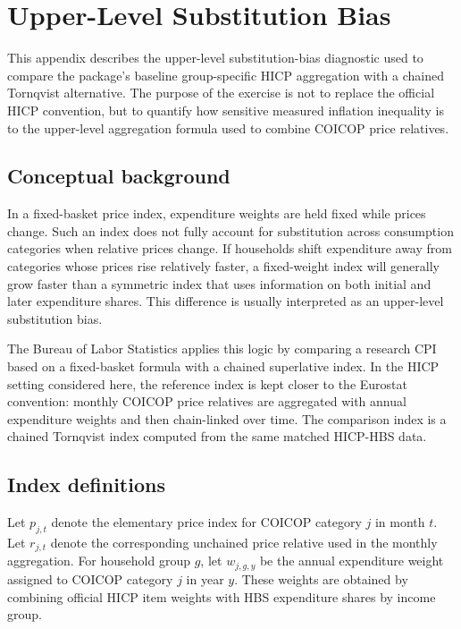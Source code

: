 \appendix
\section{Upper-Level Substitution Bias}
\label{app:substitution-bias}

This appendix describes the upper-level substitution-bias diagnostic used to
compare the package's baseline group-specific HICP aggregation with a chained
Tornqvist alternative. The purpose of the exercise is not to replace the
official HICP convention, but to quantify how sensitive measured inflation
inequality is to the upper-level aggregation formula used to combine COICOP
price relatives.

\subsection{Conceptual background}

In a fixed-basket price index, expenditure weights are held fixed while prices
change. Such an index does not fully account for substitution across
consumption categories when relative prices change. If households shift
expenditure away from categories whose prices rise relatively faster, a
fixed-weight index will generally grow faster than a symmetric index that uses
information on both initial and later expenditure shares. This difference is
usually interpreted as an upper-level substitution bias.

The Bureau of Labor Statistics applies this logic by comparing a research CPI
based on a fixed-basket formula with a chained superlative index. In the HICP
setting considered here, the reference index is kept closer to the Eurostat
convention: monthly COICOP price relatives are aggregated with annual
expenditure weights and then chain-linked over time. The comparison index is a
chained Tornqvist index computed from the same matched HICP-HBS data.

\subsection{Index definitions}

Let \(p_{j,t}\) denote the elementary price index for COICOP category \(j\) in
month \(t\). Let \(r_{j,t}\) denote the corresponding unchained price relative
used in the monthly aggregation. For household group \(g\), let
\(w_{j,g,y}\) be the annual expenditure weight assigned to COICOP category
\(j\) in year \(y\). These weights are obtained by combining official HICP
item weights with HBS expenditure shares by income group.

